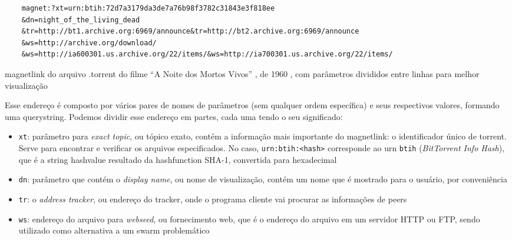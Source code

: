 \begin{listing}[ht!]
    \begin{verbatim}
    magnet:?xt=urn:btih:72d7a3179da3de7a76b98f3782c31843e3f818ee
    &dn=night_of_the_living_dead
    &tr=http://bt1.archive.org:6969/announce&tr=http://bt2.archive.org:6969/announce
    &ws=http://archive.org/download/
    &ws=http://ia600301.us.archive.org/22/items/&ws=http://ia700301.us.archive.org/22/items/
    \end{verbatim}
    \caption{\gls*{magnetlink} do arquivo .torrent do filme ``A Noite dos Mortos Vivos''
    , de 1960 \cite{torrent-file}, com parâmetros divididos entre linhas para melhor
    visualização}
    \label{lst:torrent-file-magnet-link}
\end{listing}

Esse endereço é composto por vários pares de nomes de parâmetros (sem qualquer ordem
específica) e seus respectivos valores, formando uma \gls{querystring}. Podemos
dividir esse endereço em partes, cada uma tendo o seu significado:

\begin{itemize}
    \item \verb|xt|: parâmetro para \emph{exact topic}, ou tópico exato, contém a
        informação mais importante do \gls*{magnetlink}: o identificador único de
        \gls*{torrent}. Serve para encontrar e verificar os arquivos especificados.
        No caso, \verb|urn:btih:<hash>| corresponde ao \gls{urn} \verb|btih|
        (\emph{BitTorrent Info Hash}), que é a \gls*{string} \gls{hashvalue} resultado
        da \gls{hashfunction} SHA-1, convertida para hexadecimal

    \item \verb|dn|: parâmetro que contém o \emph{display name}, ou nome de
        visualização, contém um nome que é mostrado para o usuário, por conveniência

    \item \verb|tr|: o \emph{address tracker}, ou endereço do \gls*{tracker}, onde o
        programa cliente vai procurar as informações de \glspl*{peer}

    \item \verb|ws|: endereço do arquivo para \emph{webseed}, ou fornecimento web,
        que é o endereço do arquivo em um servidor HTTP ou FTP, sendo utilizado como
        alternativa a um \gls*{swarm} problemático \cite{wiki:torrent}
\end{itemize}

